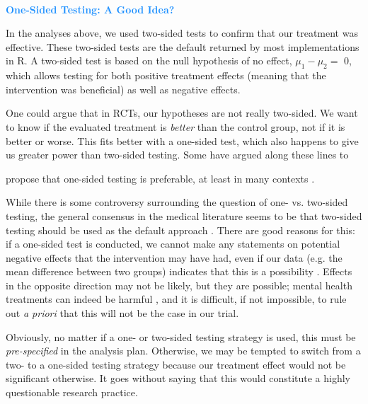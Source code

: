 \begin{box-info} \\
\textcolor{dodgerblue}{\textbf{One-Sided Testing: A Good Idea?}} 

\vspace{2mm}

In the analyses above, we used two-sided tests to confirm that our treatment was effective. These two-sided tests are the default returned by most implementations in \textsf{R}. A two-sided test is based on the null hypothesis of no effect, $\mu_1 - \mu_2=$ 0, which allows testing for both positive treatment effects (meaning that the intervention was beneficial) as well as negative effects. 

\vspace{2mm}

\hspace*{5mm} One could argue that in RCTs, our hypotheses are not really two-sided. We want to know if the evaluated treatment is \emph{better} than the control group, not if it is better or worse. This fits better with a one-sided test, which also happens to give us greater power than two-sided testing. Some have argued along these lines to

\end{box-info}

\begin{box-info-continued}

propose that one-sided testing is preferable, at least in many contexts \citep{knottnerus2001ethics, owen2007ethics}. 

\vspace{2mm}

\hspace*{5mm} While there is some controversy surrounding the question of one- vs. two-sided testing, the general consensus in the medical literature seems to be that two-sided testing should be used as the default approach \citep{lydersen2021one}. There are good reasons for this: if a one-sided test is conducted, we cannot make any statements on potential negative effects that the intervention may have had, even if our data (e.g. the mean difference between two groups) indicates that this is a possibility \citep{moye2002defending}. Effects in the opposite direction may not be likely, but they are possible; mental health treatments can indeed be harmful \citep{mckay2021harmful, lilienfeld2007psychological, hengartner2017methodological}, and it is difficult, if not impossible, to rule out \emph{a priori} that this will not be the case in our trial. 

\vspace{2mm}

\hspace*{5mm} Obviously, no matter if a one- or two-sided testing strategy is used, this must be \emph{pre-specified} in the analysis plan. Otherwise, we may be tempted to switch from a two- to a one-sided testing strategy because our treatment effect would not be significant otherwise. It goes without saying that this would constitute a highly questionable research practice. 

\end{box-info-continued}

